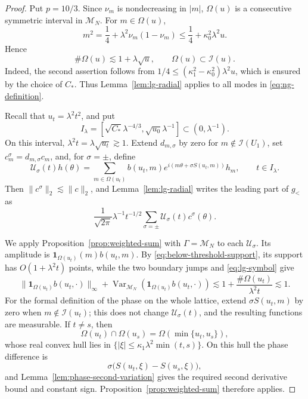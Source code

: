 \documentclass[11pt,a4paper]{amsart}
\numberwithin{equation}{section}
\newcommand{\norm}[1]{\lVert #1\rVert}
\begin{document}
\begin{proof}
Put \(p=10/3\). Since \(\nu_m\) is nondecreasing in \(|m|\),
\(\Omega(u)\) is a consecutive symmetric interval in \(\mathcal M_N\). For
\(m\in\Omega(u)\),
\[
 m^2=\frac14+\lambda^2\nu_m(1-\nu_m)
 \le\frac14+\kappa_0^2\lambda^2u.
\]
Hence
\begin{equation}\label{eq:below-threshold-support}
 \#\Omega(u)\lesssim1+\lambda\sqrt u,
 \qquad \Omega(u)\subset\mathcal I(u).
\end{equation}
Indeed, the second assertion follows from
\(1/4\le(\kappa_1^2-\kappa_0^2)\lambda^2u\), which is ensured by the
choice of \(C_*\). Thus Lemma~\ref{lem:lg-radial} applies to all modes in
\eqref{eq:ng-definition}.

Recall that \(u_t=\lambda^2t^2\), and put
\[
 I_\lambda=
 [\sqrt{C_*}\lambda^{-4/3},\sqrt{u_0}\lambda^{-1}]
 \subset(0,\lambda^{-1}).
\]
On this interval, \(\lambda^2t=\lambda\sqrt{u_t}\gtrsim1\). Extend \(d_{m,\sigma}\) by zero for \(m\notin\mathcal I(U_1)\), set
\(c_m^\sigma=d_{m,\sigma}c_m\), and, for \(\sigma=\pm\), define
\[
 \mathcal U_\sigma(t)h(\theta)
 =\sum_{m\in\Omega(u_t)}b(u_t,m)
 e^{i(m\theta+\sigma S(u_t,m))}h_m,
 \qquad t\in I_\lambda.
\]
Then \(\norm{c^\sigma}_2\lesssim\norm c_2\), and
Lemma~\ref{lem:lg-radial} writes the leading part of \(g_<\) as
\[
 \frac1{\sqrt{2\pi}}\lambda^{-1}t^{-1/2}
 \sum_{\sigma=\pm}\mathcal U_\sigma(t)c^\sigma(\theta).
\]

We apply Proposition~\ref{prop:weighted-sum} with
\(\Gamma=\mathcal M_N\) to each \(\mathcal U_\sigma\). Its amplitude is
\(\mathbf1_{\Omega(u_t)}(m)b(u_t,m)\). By
\eqref{eq:below-threshold-support}, its support has
\(O(1+\lambda^2t)\) points, while the two boundary jumps and
\eqref{eq:lg-symbol} give
\[
 \norm{\mathbf1_{\Omega(u_t)}b(u_t,\cdot)}_\infty
 +\operatorname{Var}_{\mathcal M_N}
   (\mathbf1_{\Omega(u_t)}b(u_t,\cdot))
 \lesssim1+\frac{\#\Omega(u_t)}{\lambda^2t}
 \lesssim1.
\]
For the formal definition of the phase on the whole lattice, extend
\(\sigma S(u_t,m)\) by zero when \(m\notin\mathcal I(u_t)\); this does not
change \(\mathcal U_\sigma(t)\), and the resulting functions are measurable.
If \(t\ne s\), then
\[
 \Omega(u_t)\cap\Omega(u_s)=\Omega(\min\{u_t,u_s\}),
\]
whose real convex hull lies in
\(\{|\xi|\le\kappa_1\lambda^2\min(t,s)\}\). On this hull the phase
difference is
\[
 \sigma\bigl(S(u_t,\xi)-S(u_s,\xi)\bigr),
\]
and Lemma~\ref{lem:phase-second-variation} gives the required second
derivative bound and constant sign. Proposition~\ref{prop:weighted-sum}
therefore applies.


\end{proof}
\end{document}
